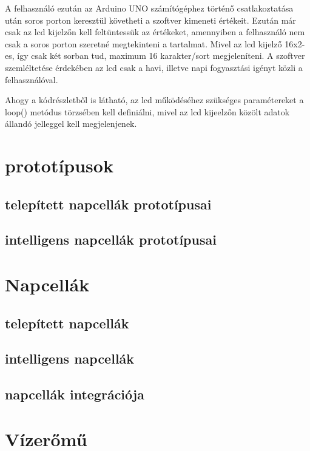 \documentclass[
]{thesis-ekf}
\theoremstyle{definition}
\theoremstyle{remark}
\begin{document}
							
			\par A felhasználó ezután az Arduino UNO számítógéphez történő csatlakoztatása után soros porton keresztül követheti a szoftver kimeneti értékeit. Ezután már csak az lcd kijelzőn kell feltüntessük az értékeket, amennyiben a felhasználó nem csak a soros porton szeretné megtekinteni a tartalmat. Mivel az lcd kijelző 16x2-es, így csak két sorban tud, maximum 16 karakter/sort megjeleníteni. A szoftver szemléltetése érdekében az lcd csak a havi, illetve napi fogyasztási igényt közli a felhasználóval. 
								
			\par Ahogy a kódrészletből is látható, az lcd működéséhez szükséges paramétereket a loop() metódus törzsében kell definiálni, mivel az lcd kijeelzőn közölt adatok állandó jelleggel kell megjelenjenek.
	\section{prototípusok}
		\subsection{telepített napcellák prototípusai}
		\subsection{intelligens napcellák prototípusai}
 	\section{Napcellák}
 		\subsection{telepített napcellák}
 		\subsection{intelligens napcellák}
 		\subsection{napcellák integrációja}
 	\section{Vízerőmű}
 	
 	

	
	
		
\end{document}
